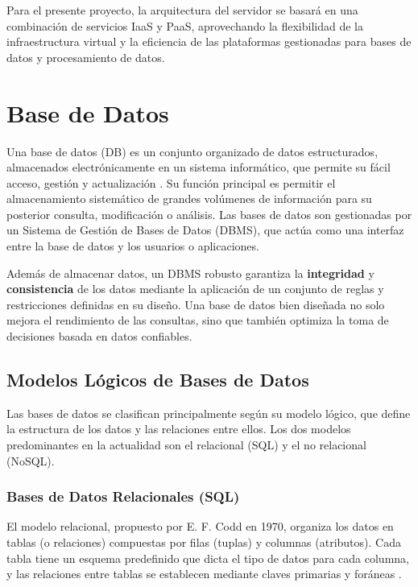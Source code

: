 Para el presente proyecto, la arquitectura del servidor se basará en una combinación de servicios IaaS y PaaS, aprovechando la flexibilidad de la infraestructura virtual y la eficiencia de las plataformas gestionadas para bases de datos y procesamiento de datos.


\section{Base de Datos}
\label{sec:base_de_datos}

Una base de datos (DB) es un conjunto organizado de datos estructurados, almacenados electrónicamente en un sistema informático, que permite su fácil acceso, gestión y actualización \cite{mullins2012database}. Su función principal es permitir el almacenamiento sistemático de grandes volúmenes de información para su posterior consulta, modificación o análisis. Las bases de datos son gestionadas por un Sistema de Gestión de Bases de Datos (DBMS), que actúa como una interfaz entre la base de datos y los usuarios o aplicaciones.

Además de almacenar datos, un DBMS robusto garantiza la \textbf{integridad} y \textbf{consistencia} de los datos mediante la aplicación de un conjunto de reglas y restricciones definidas en su diseño. Una base de datos bien diseñada no solo mejora el rendimiento de las consultas, sino que también optimiza la toma de decisiones basada en datos confiables.

\subsection{Modelos Lógicos de Bases de Datos}
\label{subsec:modelos_logicos_db}

Las bases de datos se clasifican principalmente según su modelo lógico, que define la estructura de los datos y las relaciones entre ellos. Los dos modelos predominantes en la actualidad son el relacional (SQL) y el no relacional (NoSQL).

\subsubsection{Bases de Datos Relacionales (SQL)}
El modelo relacional, propuesto por E. F. Codd en 1970, organiza los datos en tablas (o relaciones) compuestas por filas (tuplas) y columnas (atributos). Cada tabla tiene un esquema predefinido que dicta el tipo de datos para cada columna, y las relaciones entre tablas se establecen mediante claves primarias y foráneas \cite{oracle2024sql}.

